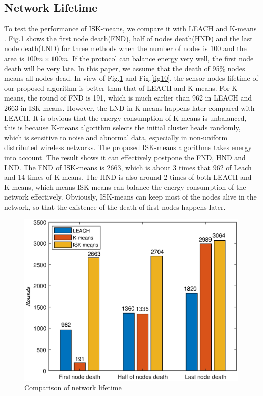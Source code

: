 \documentclass[journal,twoside,web]{ieeecolor}
\begin{document}
\subsection{Network Lifetime}
To test the performance of ISK-means, we compare it with LEACH \cite{1045297} and K-means \cite{6375088}. Fig.\ref{fig9} shows the first node death(FND), half of nodes death(HND) and the last node death(LND) for three methods when the number of nodes is 100 and the area is $100m \times 100m$. If the protocol can balance energy very well, the first node death will be very late. In this paper, we assume that the death of 95\% nodes means all nodes dead. In view of Fig.\ref{fig9} and Fig.\ref{fig10}, the sensor nodes lifetime of our proposed algorithm is better than that of LEACH and K-means. For K-means, the round of FND is 191, which is much earlier than 962 in LEACH and 2663 in ISK-means. However, the LND in K-means happens later compared with LEACH. It is obvious that the energy consumption of K-means is unbalanced, this is because K-means algorithm selects the initial cluster heads randomly, which is sensitive to noise and abnormal data, especially in non-uniform distributed wireless networks. The proposed ISK-means algorithms takes energy into account. The result shows it can effectively postpone the FND, HND and LND. The FND of ISK-means is 2663, which is about 3 times that 962 of Leach and 14 times of K-means. The HND is also around 2 times of both LEACH and K-means, which means ISK-means can balance the energy consumption of the network effectively. Obviously, ISK-means can keep most of the nodes alive in the network, so that the existence of the death of first nodes happens later. 

\begin{figure}[!t]
	\centering
	\includegraphics[width=0.9\linewidth]{three.eps}
	\caption{Comparison of network lifetime}
	\label{fig9}
\end{figure}
\end{document}
